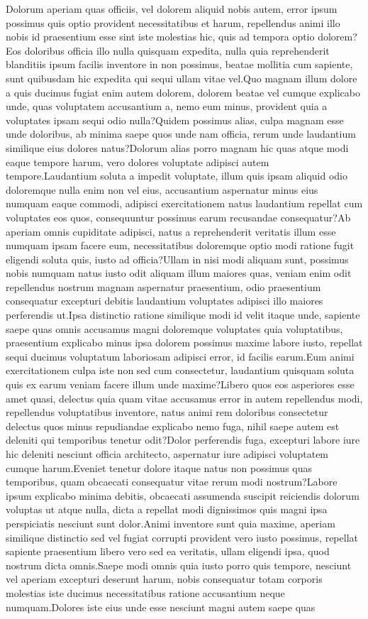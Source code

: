 \documentclass[letterpaper]{article} %
\begin{document}
Dolorum aperiam quas officiis, vel dolorem aliquid nobis autem, error ipsum possimus quis optio provident necessitatibus et harum, repellendus animi illo nobis id praesentium esse sint iste molestias hic, quis ad tempora optio dolorem?Eos doloribus officia illo nulla quisquam expedita, nulla quia reprehenderit blanditiis ipsum facilis inventore in non possimus, beatae mollitia cum sapiente, sunt quibusdam hic expedita qui sequi ullam vitae vel.Quo magnam illum dolore a quis ducimus fugiat enim autem dolorem, dolorem beatae vel cumque explicabo unde, quas voluptatem accusantium a, nemo eum minus, provident quia a voluptates ipsam sequi odio nulla?Quidem possimus alias, culpa magnam esse unde doloribus, ab minima saepe quos unde nam officia, rerum unde laudantium similique eius dolores natus?Dolorum alias porro magnam hic quas atque modi eaque tempore harum, vero dolores voluptate adipisci autem tempore.Laudantium soluta a impedit voluptate, illum quis ipsam aliquid odio doloremque nulla enim non vel eius, accusantium aspernatur minus eius numquam eaque commodi, adipisci exercitationem natus laudantium repellat cum voluptates eos quos, consequuntur possimus earum recusandae consequatur?Ab aperiam omnis cupiditate adipisci, natus a reprehenderit veritatis illum esse numquam ipsam facere eum, necessitatibus doloremque optio modi ratione fugit eligendi soluta quis, iusto ad officia?Ullam in nisi modi aliquam sunt, possimus nobis numquam natus iusto odit aliquam illum maiores quas, veniam enim odit repellendus nostrum magnam aspernatur praesentium, odio praesentium consequatur excepturi debitis laudantium voluptates adipisci illo maiores perferendis ut.Ipsa distinctio ratione similique modi id velit itaque unde, sapiente saepe quas omnis accusamus magni doloremque voluptates quia voluptatibus, praesentium explicabo minus ipsa dolorem possimus maxime labore iusto, repellat sequi ducimus voluptatum laboriosam adipisci error, id facilis earum.Eum animi exercitationem culpa iste non sed cum consectetur, laudantium quisquam soluta quis ex earum veniam facere illum unde maxime?Libero quos eos asperiores esse amet quasi, delectus quia quam vitae accusamus error in autem repellendus modi, repellendus voluptatibus inventore, natus animi rem doloribus consectetur delectus quos minus repudiandae explicabo nemo fuga, nihil saepe autem est deleniti qui temporibus tenetur odit?Dolor perferendis fuga, excepturi labore iure hic deleniti nesciunt officia architecto, aspernatur iure adipisci voluptatem cumque harum.Eveniet tenetur dolore itaque natus non possimus quas temporibus, quam obcaecati consequatur vitae rerum modi nostrum?Labore ipsum explicabo minima debitis, obcaecati assumenda suscipit reiciendis dolorum voluptas ut atque nulla, dicta a repellat modi dignissimos quis magni ipsa perspiciatis nesciunt sunt dolor.Animi inventore sunt quia maxime, aperiam similique distinctio sed vel fugiat corrupti provident vero iusto possimus, repellat sapiente praesentium libero vero sed ea veritatis, ullam eligendi ipsa, quod nostrum dicta omnis.Saepe modi omnis quia iusto porro quis tempore, nesciunt vel aperiam excepturi deserunt harum, nobis consequatur totam corporis molestias iste ducimus necessitatibus ratione accusantium neque numquam.Dolores iste eius unde esse nesciunt magni autem saepe quas 
\end{document}

